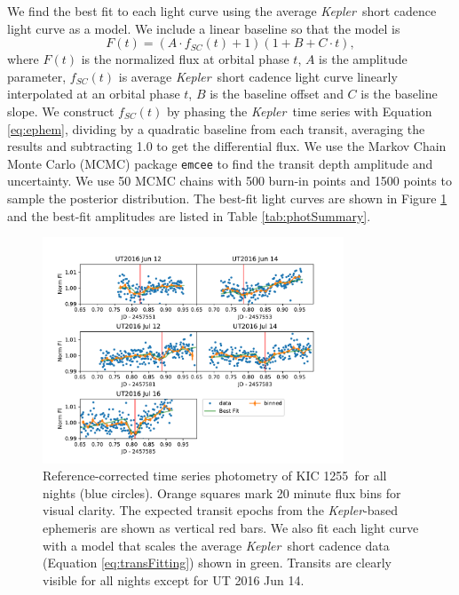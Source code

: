 \documentclass[preprint,trackchanges]{aastex61}
\newcommand{\shStar}{KIC 1255}
\newcommand{\kepler}{{\it Kepler}}
\begin{document}
We find the best fit to each light curve using the average \kepler\ short cadence light curve as a model.
We include a linear baseline so that the model is
\begin{equation}\label{eq:transFitting}
F(t) = \left(A \cdot f_{SC}(t) + 1 \right)  (1 + B + C \cdot t),
\end{equation}
where $F(t)$ is the normalized flux at orbital phase $t$, $A$ is the amplitude parameter, $f_{SC}(t)$ is average \kepler\ short cadence light curve linearly interpolated at an orbital phase $t$, $B$ is the baseline offset and $C$ is the baseline slope.
We construct $f_{SC}(t)$ by phasing the \kepler\ time series with Equation \ref{eq:ephem}, dividing by a quadratic baseline from each transit, averaging the results and subtracting 1.0 to get the differential flux.
We use the Markov Chain Monte Carlo (MCMC) package \texttt{emcee} \citep{foreman-mackey2013emcee} to find the transit depth amplitude and uncertainty.
We use 50 MCMC chains with 500 burn-in points and 1500 points to sample the posterior distribution.
The best-fit light curves are shown in Figure \ref{fig:allNightrefCorrect} and the best-fit amplitudes are listed in Table \ref{tab:photSummary}.

\begin{figure}
\begin{centering}
\includegraphics[width=0.8\textwidth]{all_kic1255_refcor.pdf}
\caption{Reference-corrected time series photometry of \shStar\ for all nights (blue circles).
Orange squares mark 20 minute flux bins for visual clarity.
The expected transit epochs from the \kepler-based ephemeris \citep{croll2015starspots} are shown as vertical red bars.
We also fit each light curve with a model that scales the average \kepler\ short cadence data (Equation \ref{eq:transFitting}) shown in green.
Transits are clearly visible for all nights except for UT 2016 Jun 14.}\label{fig:allNightrefCorrect}
\end{centering}
\end{figure}
\end{document}
